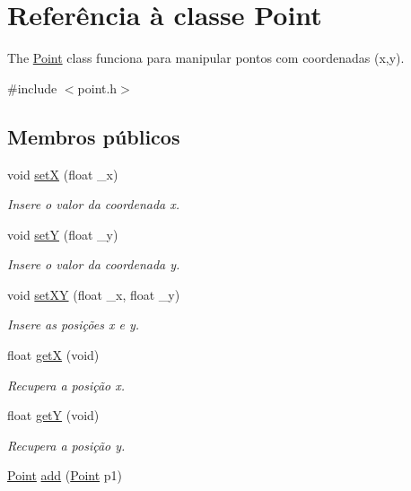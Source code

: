 \hypertarget{class_point}{}\section{Referência à classe Point}
\label{class_point}


The \hyperlink{class_point}{Point} class funciona para manipular pontos com coordenadas (x,y).  




{\ttfamily \#include $<$point.\+h$>$}

\subsection*{Membros públicos}
\begin{DoxyCompactItemize}
\item 
void \hyperlink{class_point_a428a1676e2fdec6753c42011a1d59d18}{setX} (float \+\_\+x)
\begin{DoxyCompactList}\small\item\em Insere o valor da coordenada x. \end{DoxyCompactList}\item 
void \hyperlink{class_point_a9868c4601b0ea0c2d0de20fe41ee0e49}{setY} (float \+\_\+y)
\begin{DoxyCompactList}\small\item\em Insere o valor da coordenada y. \end{DoxyCompactList}\item 
void \hyperlink{class_point_ab5385c6d9bfa841e641e4709fc9f14cc}{set\+XY} (float \+\_\+x, float \+\_\+y)
\begin{DoxyCompactList}\small\item\em Insere as posições x e y. \end{DoxyCompactList}\item 
float \hyperlink{class_point_a9aa94b8fd07296e64d304ef3750db113}{getX} (void)
\begin{DoxyCompactList}\small\item\em Recupera a posição x. \end{DoxyCompactList}\item 
float \hyperlink{class_point_a2444daa96871c89614510bc4bfcd19ce}{getY} (void)
\begin{DoxyCompactList}\small\item\em Recupera a posição y. \end{DoxyCompactList}\item 
\hyperlink{class_point}{Point} \hyperlink{class_point_a9dbea84b07b0a8ec3bbb9e58b3d15899}{add} (\hyperlink{class_point}{Point} p1)

\end{DoxyCompactItemize}
